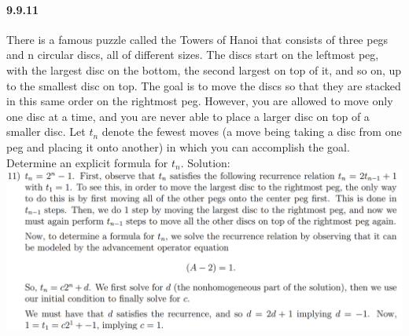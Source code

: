 \documentclass{article}
\begin{document}
\paragraph{9.9.11}
There is a famous puzzle called the Towers of Hanoi that consists of three pegs and n circular discs, all of different sizes. The discs start on the leftmost peg, with the largest disc on the bottom, the second largest on top of it, and so on, up to the smallest disc on top. The goal is to move the discs so that they are stacked in this same order on the rightmost peg. However, you are allowed to move only one disc at a time, and you are never able to place a larger disc on top of a smaller disc. Let $t_n$ denote the fewest moves (a move being taking a disc from one peg and placing it onto another) in which you can accomplish the goal. Determine an explicit formula for $t_n$.\newline
Solution:\newline
\includegraphics{0047}
\end{document}
